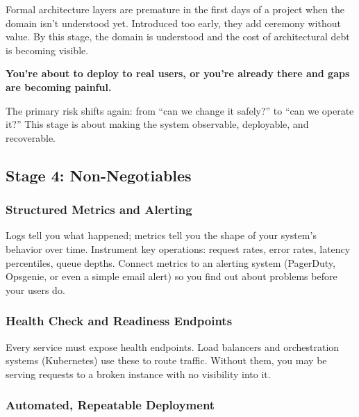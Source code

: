 Formal architecture layers are premature in the first days of a project when the domain isn't understood yet. Introduced too early, they add ceremony without value. By this stage, the domain is understood and the cost of architectural debt is becoming visible.

\label{writing-good-code:stage-4--production-readiness}

\begin{notebox}

\textbf{You're about to deploy to real users, or you're already there and gaps are becoming painful.}

\end{notebox}

\noindent{}The primary risk shifts again: from ``can we change it safely?'' to ``can we operate it?'' This stage is about making the system observable, deployable, and recoverable.

\subsection*{Stage 4: Non-Negotiables}\label{writing-good-code:stage-4-non-negotiables}

\subsubsection*{Structured Metrics and Alerting}\label{writing-good-code:structured-metrics-and-alerting}

Logs tell you what happened; metrics tell you the shape of your system's behavior over time. Instrument key operations: request rates, error rates, latency percentiles, queue depths. Connect metrics to an alerting system (PagerDuty, Opsgenie, or even a simple email alert) so you find out about problems before your users do.

\subsubsection*{Health Check and Readiness Endpoints}\label{writing-good-code:health-check-and-readiness-endpoints}

Every service must expose health endpoints. Load balancers and orchestration systems (Kubernetes) use these to route traffic. Without them, you may be serving requests to a broken instance with no visibility into it.

\subsubsection*{Automated, Repeatable Deployment}\label{writing-good-code:automated-repeatable-deployment}

